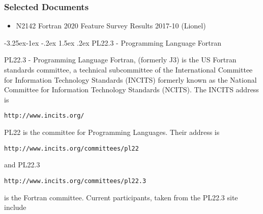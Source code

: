 \documentclass[10pt,letterpaper,twoside]{article}
\makeatletter
\renewcommand\subsection{\@startsection{subsection}{2}{\z@}%
                                     {-3.25ex\@plus -1ex \@minus -.2ex}%
                                     {1.5ex \@plus .2ex}%
                                     {\sf\normalsize\bfseries}}
\makeatother
\begin{document}
\subsubsection{Selected Documents}

\begin{itemize}

\item{N2142 Fortran 2020 Feature Survey Results 2017-10 (Lionel)}

\end{itemize}


\subsection{PL22.3 - Programming Language Fortran}

PL22.3 - Programming Language Fortran, (formerly J3) is the US Fortran 
standards committee, a technical subcommittee of the International 
Committee for Information Technology Standards (INCITS) formerly known 
as the National Committee for Information Technology Standards (NCITS). 
The INCITS address is

\begin{verbatim}
http://www.incits.org/
\end{verbatim}

PL22 is the committee for Programming Languages. Their address is

\begin{verbatim}
http://www.incits.org/committees/pl22
\end{verbatim}

and PL22.3

\begin{verbatim}
http://www.incits.org/committees/pl22.3
\end{verbatim}

is the Fortran committee. Current participants, taken from the PL22.3 
site include
\end{document}
